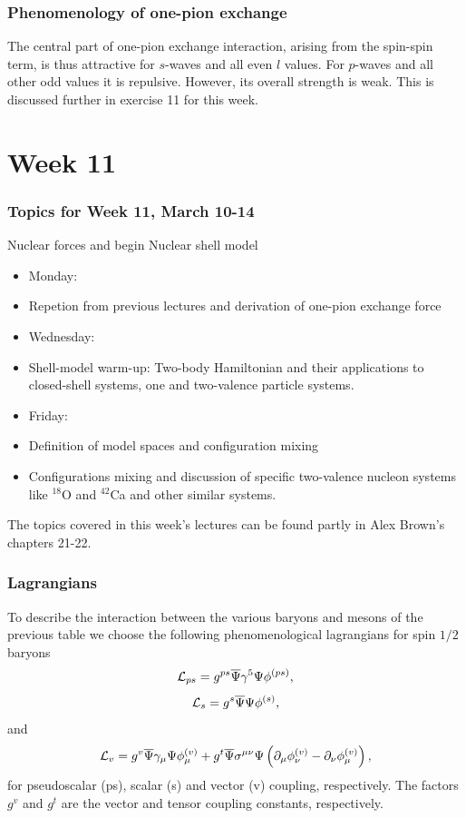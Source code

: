 \documentclass[compress]{beamer}
\begin{document}
\frame
{
\frametitle{Phenomenology of one-pion exchange}
\begin{small}
{\scriptsize
The central part of one-pion exchange interaction, arising from the spin-spin term,  
is thus attractive for $s$-waves and all even $l$ values. For $p$-waves and all other odd values
it is repulsive. However, its overall strength is weak. This is discussed further in exercise 11 for this week.
}
\end{small}
}










\section[Week 11]{Week 11}

\frame
{
  \frametitle{Topics for Week 11, March 10-14}
  \begin{block}{Nuclear forces and begin Nuclear shell model}
\begin{itemize}
\item Monday:
\item Repetion from previous lectures and derivation of one-pion exchange force
\item Wednesday:
\item Shell-model warm-up: Two-body Hamiltonian and their applications to closed-shell systems, one and two-valence particle systems.
\item Friday:
\item Definition of model spaces and configuration mixing
\item Configurations mixing and discussion of specific two-valence nucleon systems like $^{18}$O and $^{42}$Ca and other similar systems.
\end{itemize}
The topics covered in this week's lectures can be found partly in Alex Brown's chapters 21-22. 
  \end{block}
} 




\frame
{
\frametitle{Lagrangians}
To describe the interaction between the various baryons and mesons of the previous
table we choose the following phenomenological
lagrangians
for spin $1/2$ baryons
\[
   {\cal L}_{ps} =g^{ps}\overline{\Psi}\gamma^{5}
   \Psi\phi^{(ps)},
   \label{eq:pseudo}
\]
\[
   {\cal L}_{s} =g^{s}\overline{\Psi}\Psi\phi^{(s)},
   \label{eq:scalar}
\]
and
\[
   {\cal L}_{v} =g^{v}\overline{\Psi}\gamma_{\mu}\Psi\phi_{\mu}^{(v)}
   +g^{t}\overline{\Psi}\sigma^{\mu\nu}\Psi\left
   (\partial_{\mu}\phi_{\nu}^{(v)}
   -\partial_{\nu}\phi_{\mu}^{(v)}\right),
   \label{eq:vector}
\]
for pseudoscalar (ps), scalar (s) and vector (v) coupling, respectively.
The factors $g^{v}$ and $g^{t}$ are the vector
and tensor coupling constants, respectively.
}
\end{document}
